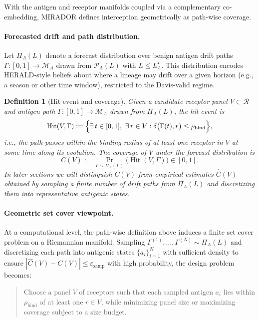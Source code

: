 \documentclass[11pt]{article}
\newcommand{\Rcal}{\mathcal{R}}
\newcommand{\M}{\mathcal{M}}
\newcommand{\Pcal}{\mathcal{P}}
\newcommand{\Hit}{\operatorname{Hit}}
\newtheorem{definition}{Definition}
\begin{document}
With the antigen and receptor manifolds coupled via a complementary co-embedding, MIRADOR defines interception geometrically as path-wise coverage.

\paragraph{Forecasted drift and path distribution.}
Let $\Pi_A(L)$ denote a forecast distribution over benign antigen drift paths $\Gamma : [0,1] \to \M_A$ drawn from $\Pcal_A(L)$ with $L \le L_A^\star$. This distribution encodes HERALD-style beliefs about where a lineage may drift over a given horizon (e.g., a season or other time window), restricted to the Davis-valid regime.

\begin{definition}[Hit event and coverage]
\label{def:hit-event}
Given a candidate receptor panel $V \subset \Rcal$ and antigen path $\Gamma : [0,1] \to \M_A$ drawn from $\Pi_A(L)$, the \emph{hit} event is
\[
  \Hit(V,\Gamma)
  := \Bigl\{\exists\,t \in [0,1],\ \exists\,r \in V :
         \delta\bigl(\Gamma(t), r\bigr) \le \rho_{\mathrm{bind}} \Bigr\},
\]
i.e., the path passes within the binding radius of at least one receptor in $V$ at some time along its evolution. The \emph{coverage} of $V$ under the forecast distribution is
\[
  C(V) := \Pr_{\Gamma \sim \Pi_A(L)}\bigl(\Hit(V,\Gamma)\bigr) \in [0,1].
\]
In later sections we will distinguish $C(V)$ from empirical estimates $\widehat{C}(V)$ obtained by sampling a finite number of drift paths from $\Pi_A(L)$ and discretizing them into representative antigenic states.
\end{definition}

\paragraph{Geometric set cover viewpoint.}
At a computational level, the path-wise definition above induces a finite set cover problem on a Riemannian manifold. Sampling $\Gamma^{(1)},\dots,\Gamma^{(N)} \sim \Pi_A(L)$ and discretizing each path into antigenic states $\{a_i\}_{i=1}^N$ with sufficient density to ensure $|\widehat{C}(V) - C(V)| \le \varepsilon_{\mathrm{samp}}$ with high probability, the design problem becomes:

\begin{quote}
  Choose a panel $V$ of receptors such that each sampled antigen $a_i$ lies within $\rho_{\mathrm{bind}}$ of at least one $r \in V$, while minimizing panel size or maximizing coverage subject to a size budget.
\end{quote}
\end{document}
